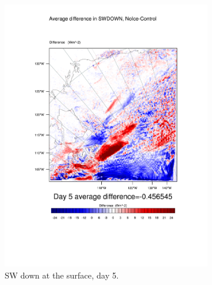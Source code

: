 \begin{figure}
\centering
	\begin{subfigure}{0.48\textwidth}
		\includegraphics[width=\textwidth]{results/noice/diff_NoIce_SWDOWN_Day5.pdf}
		\caption{SW down at the surface, day 5.}
		\label{subfig:swdown_r2Day5}
	\end{subfigure}
	\quad
	\begin{subfigure}{0.48\textwidth}
		\centering

\end{subfigure}
\end{figure}
